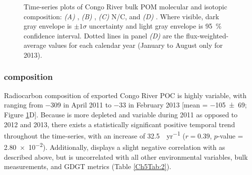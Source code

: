 \begin{figure}[ht]
	\caption[Bulk parameter time-series plots]{Time-series plots of Congo River bulk POM molecular and isotopic composition: \textit{(A)} , \textit{(B)} , \textit{(C)} N/C, and \textit{(D)} . Where visible, dark gray envelope is $\pm 1 \sigma$ uncertainty and light gray envelope is \SI{95}{\%} confidence interval. Dotted lines in panel \textit{(D)} are the flux-weighted-average values for each calendar year (January to August only for 2013).}
	\label{Ch5Fig:3} 
\end{figure}

\subsubsection{ composition}

Radiocarbon composition of exported Congo River POC is highly variable, with  ranging from \SI{-309}{\permil} in April 2011 to \SI{-33}{\permil} in February 2013 [mean = \SI{-105 \pm 69}{\permil}; Figure \ref{Ch5Fig:3}D]. Because  is more depleted and variable during 2011 as opposed to 2012 and 2013, there exists a statistically significant positive temporal trend throughout the time-series, with an increase of \SI{32.5}{\permil.yr^{-1}} ($r = 0.39$, $p$-value = \num{2.80e-2}). Additionally,  displays a slight negative correlation with  as described above, but is uncorrelated with all other environmental variables, bulk measurements, and GDGT metrics (Table \ref{Ch5Tab:2}).

